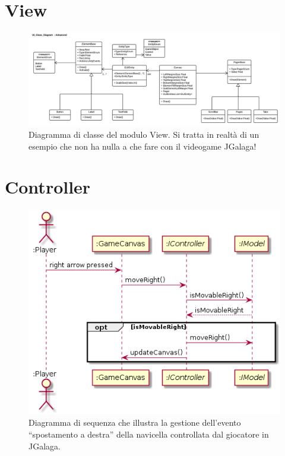 \documentclass[12pt,a4paper]{report}
\begin{document}
\lipsum[14]

\section{View}\label{se:arch.view}
\lipsum[16]

\begin{figure}[tb]
  \includegraphics[width=\linewidth]{UI-Class-Diagram-Advanced}
  \caption{Diagramma di classe del modulo View. Si tratta in realt\`a di un esempio che non ha nulla a che fare con il videogame JGalaga!}
  \label{fig:view}
\end{figure}

\lipsum[17-19]

\section{Controller}\label{se:arch.cont}
\lipsum[20]

\begin{figure}[tb]
  \centering
  \includegraphics[width=.70\linewidth]{SequenceDiagram-PlantText.png}
  \caption{Diagramma di sequenza che illustra la gestione dell'evento ``spostamento a destra'' della navicella controllata dal giocatore in JGalaga.}
  \label{fig:controller-seq-diag}
\end{figure}
\end{document}
